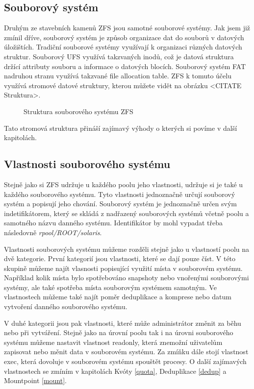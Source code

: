     \subsection{Souborový systém}
    Druhým ze stavebních kamenů ZFS jsou samotné souborové systémy. Jak jsem již zmínil dříve, souborový systém je způsob organizace dat do souborů v datových úložištích.
    Tradiční souborové systémy využívají k organizaci různých datových struktur. Souborový UFS využívá takzvaných inodů, což je datová struktura držící attributy souboru a informace o datových blocích. Souborový systém FAT nadruhou stranu využívá takzvané file allocation table. ZFS k tomuto účelu využívá stromové datové struktury, kterou můžete vidět na obrázku <CITATE Struktura>. \begin{figure}[!h]
        \caption{Struktura souborového systému ZFS}
        \label{structure}        
    \end{figure}
    
    Tato stromová struktura přináší zajímavý výhody o kterých si povíme v další kapitolách.
    \subsection{Vlastnosti souborového systému}
    Stejně jako si ZFS udržuje u každého poolu jeho vlastnosti, udržuje si je také u každého souborového systému. Tyto vlastnosti jednoznačně určují souborový systém a popisují jeho chování. Souborový systém je jednoznačně určen svým indetifikátorem, který se skládá z nadřazený souborových systémů včetně poolu a samotného názvu danného systému. Identifikátor by mohl vypadat třeba následovně \emph{rpool/ROOT/solaris}.

    Vlastnosti souborových systému můžeme rozděli stejně jako u vlastností poolu na dvě kategorie. První kategorií jsou vlastnosti, které se dají pouze číst. V této skupině můžeme najít vlasnosti popisující využití místa v souborovém systému. Například kolik místa bylo spotřebováno snapshoty nebo vnořenými souborovými systémy, ale také spotřeba místa souborovým systémem samotným. Ve vlastnostech můžeme také najít poměr deduplikace a komprese nebo datum vytvoření danného souborového systému.

    V duhé kategorii jsou pak vlastnosti, které může administrátor změnit za běhu nebo při vytváření. Stejně jako na úrovní poolu tak i na úrovni souborového systému můžeme nastavit vlastnost readonly, která znemožní uživatelům zapisovat nebo měnit data v souborovém systému. Za zmíňku dále stojí vlastnost exec, která dovoluje v souborovém systému spouštět procesy. O další zajímavých vlastnostech se zmíním v kapitolách Kvóty \ref{quota}, Deduplikace \ref{dedup} a Mountpoint \ref{mount}.

